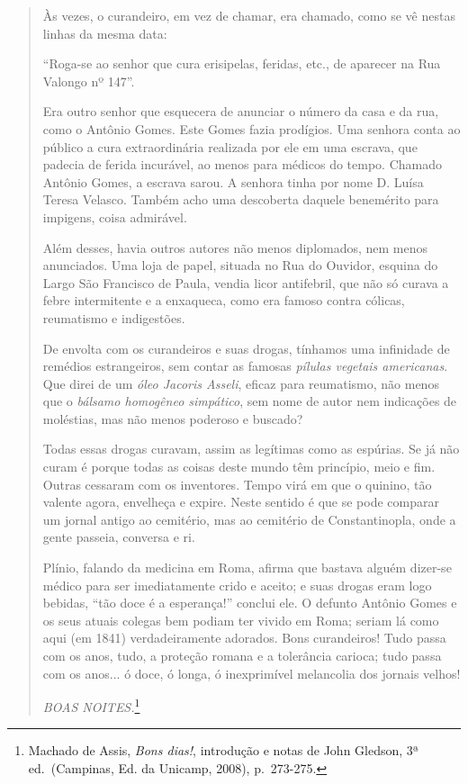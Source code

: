 \begin{quote}
Às vezes, o curandeiro, em vez de chamar, era chamado, como se vê nestas
linhas da mesma data:

``Roga-se ao senhor que cura erisipelas, feridas, etc., de aparecer na
Rua Valongo nº 147''.

Era outro senhor que esquecera de anunciar o número da casa e da rua,
como o Antônio Gomes. Este Gomes fazia prodígios. Uma senhora conta ao
público a cura extraordinária realizada por ele em uma escrava, que
padecia de ferida incurável, ao menos para médicos do tempo. Chamado
Antônio Gomes, a escrava sarou. A senhora tinha por nome D. Luísa Teresa
Velasco. Também acho uma descoberta daquele benemérito para impigens,
coisa admirável.

Além desses, havia outros autores não menos diplomados, nem menos
anunciados. Uma loja de papel, situada no Rua do Ouvidor, esquina do
Largo São Francisco de Paula, vendia licor antifebril, que não só curava
a febre intermitente e a enxaqueca, como era famoso contra cólicas,
reumatismo e indigestões.

De envolta com os curandeiros e suas drogas, tínhamos uma infinidade de
remédios estrangeiros, sem contar as famosas \emph{pílulas vegetais
americanas}. Que direi de um \emph{óleo Jacoris Asseli}, eficaz para
reumatismo, não menos que o \emph{bálsamo homogêneo simpático}, sem nome
de autor nem indicações de moléstias, mas não menos poderoso e buscado?

Todas essas drogas curavam, assim as legítimas como as espúrias. Se já
não curam é porque todas as coisas deste mundo têm princípio, meio e
fim. Outras cessaram com os inventores. Tempo virá em que o quinino, tão
valente agora, envelheça e expire. Neste sentido é que se pode comparar
um jornal antigo ao cemitério, mas ao cemitério de Constantinopla, onde
a gente passeia, conversa e ri.

Plínio, falando da medicina em Roma, afirma que bastava alguém dizer-se
médico para ser imediatamente crido e aceito; e suas drogas eram logo
bebidas, ``tão doce é a esperança!'' conclui ele. O defunto Antônio
Gomes e os seus atuais colegas bem podiam ter vivido em Roma; seriam lá
como aqui (em 1841) verdadeiramente adorados. Bons curandeiros! Tudo
passa com os anos, tudo, a proteção romana e a tolerância carioca; tudo
passa com os anos... ó doce, ó longa, ó inexprimível melancolia dos
jornais velhos!

\emph{BOAS NOITES.}\footnote{Machado de Assis, \emph{Bons dias!},
  introdução e notas de John Gledson, 3ª ed.~(Campinas, Ed. da Unicamp,
  2008), p.~273-275.}
\end{quote}

